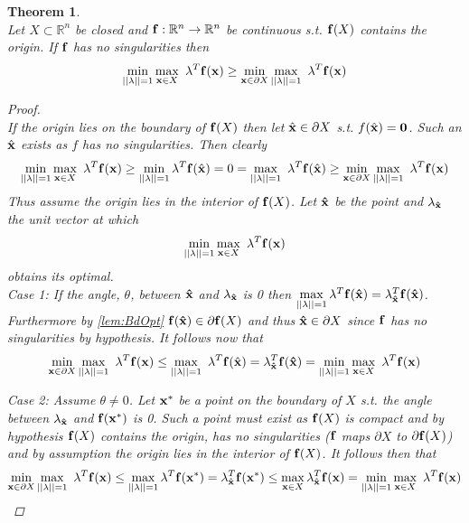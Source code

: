 \documentclass[11pt]{article}
\theoremstyle{plain}
\newtheorem{thm}{Theorem}[section]
\theoremstyle{definition}
\theoremstyle{remark}
\begin{document}
\begin{thm} \ \\
\label{thm:MainIneq}
Let $X\subset\mathbb{R}^n$ be closed and $\bold{f}:\mathbb{R}^n\rightarrow\mathbb{R}^n$ be continuous s.t. $\bold{f}(X)$ contains the origin. 
If $\bold{f}$ has no singularities then $$\min\limits_{||\bold{\lambda}||=1}\max\limits_{\bold x\in X}\ \bold{\lambda}^T\bold{f}(\bold x)\geq \min\limits_{\bold x\in \partial X}\max\limits_{||\bold{\lambda}||=1}\ \bold{\lambda}^T\bold{f}(\bold x)$$
\begin{proof} \ \\
If the origin lies on the boundary of $\bold{f}(X)$ then let $\hat{\bold x}\in \partial X$ s.t. $f(\hat{\bold x})=\textbf{0}$. 
Such an $\hat{\bold x}$ exists as $f$ has no singularities. 
Then  clearly $$\min\limits_{||\bold{\lambda}||=1}\max\limits_{\bold x\in X}\ \bold{\lambda}^T\bold{f}(\bold x)\geq \min\limits_{||\bold{\lambda}||=1}\bold{\lambda}^T\bold{f}(\hat{\bold x})= 0 = \max\limits_{||\bold{\lambda}||=1}\ \bold{\lambda}^T\bold{f}(\hat{\bold x}) \geq \min\limits_{\bold x\in \partial X}\max\limits_{||\bold{\lambda}||=1}\ \bold{\lambda}^T\bold{f}(\bold x)$$
Thus assume the origin lies in the interior of $\bold{f}(X)$.
Let $\bold{\hat{x}}$ be the point and $\bold{\lambda}_{\bold{\hat{x}}}$ the unit vector at which $$\min\limits_{||\bold{\lambda}||=1}\max\limits_{\bold x\in X}\ \bold{\lambda}^T\bold{f}(\bold x)$$
obtains its optimal. \\

Case 1: If the angle, $\theta$, between $\bold{\hat{x}}$ and $\bold{\lambda}_{\bold{\hat{x}}}$ is 0 then $\max\limits_{||\bold{\lambda}||=1}\bold{\lambda}^T\bold{f}(\bold{\hat{x}})=\bold{\lambda}_{\bold{\hat{x}}}^T\bold{f}(\bold{\hat{x}})$. 
Furthermore by \cref{lem:BdOpt} $\bold{f}(\bold{\hat{x}})\in \partial \bold{f}(X)$ and thus $\bold{\hat{x}}\in \partial X$ since $\bold{f}$ has no singularities by hypothesis. 
It follows now that $$\min\limits_{\bold x\in \partial X}\max\limits_{||\bold{\lambda}||=1}\ \bold{\lambda}^T\bold{f}(\bold x)\leq \max\limits_{||\bold{\lambda}||=1}\ \bold{\lambda}^T\bold{f}(\hat{\bold x})=\bold{\lambda}_{\bold{\hat{x}}}^T\bold{f}(\bold{\hat{x}})=\min\limits_{||\bold{\lambda}||=1}\max\limits_{\bold x\in X}\ \bold{\lambda}^T\bold{f}(\bold x)$$

Case 2: Assume $\theta \neq 0$. 
Let $\bold{x^*}$ be a point on the boundary of $X$ s.t. the angle between $\bold{\lambda}_{\bold{\hat{x}}}$ and $\bold{f}(\bold{x^*})$ is 0. 
Such a point must exist as $\bold{f}(X)$ is compact and by hypothesis $\bold{f}(X)$ contains the origin, has no singularities ($\bold{f}$ maps $\partial X$ to $\partial \bold{f}(X)$) and by assumption the origin lies in the interior of $\bold{f}(X)$. 
It follows then that $$\min\limits_{\bold x\in \partial X}\max\limits_{||\bold{\lambda}||=1}\ \bold{\lambda}^T\bold{f}(\bold x)\leq \max\limits_{||\bold{\lambda}||=1}\bold{\lambda}^T \bold{f}(\bold{x^*}) =\bold{\lambda}_{\bold{\hat{x}}}^T\bold{f}(\bold{x^*})\leq \max\limits_{\bold x\in X}\bold{\lambda}_{\bold{\hat{x}}}^T\bold{f}(\bold x)=\min\limits_{||\bold{\lambda}||=1}\max\limits_{\bold x\in X}\ \bold{\lambda}^T\bold{f}(\bold x)$$


\end{proof}
\end{thm}
\end{document}
